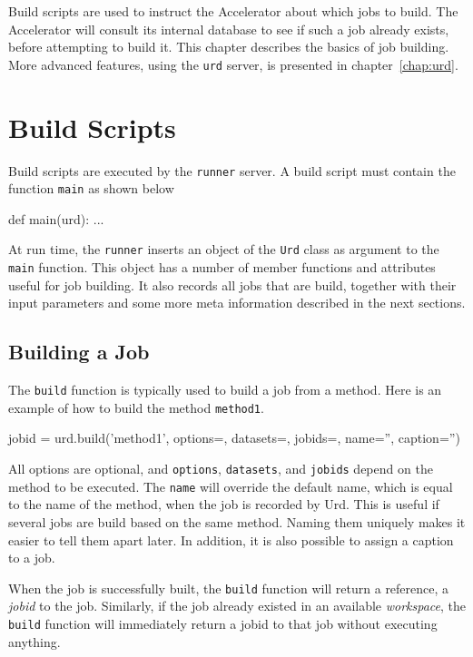 \label{chap:urd_basic}

Build scripts are used to instruct the Accelerator about which jobs to
build.  The Accelerator will consult its internal database to see if
such a job already exists, before attempting to build it.  This
chapter describes the basics of job building.  More advanced features,
using the \texttt{urd} server, is presented in chapter~\ref{chap:urd}.


\section{Build Scripts}
Build scripts are executed by the \texttt{runner} server.  A build
script must contain the function \texttt{main} as shown below
\begin{python}
def main(urd):
    ...
\end{python}
At run time, the \texttt{runner} inserts an object of the \texttt{Urd}
class as argument to the \texttt{main} function.  This object has a
number of member functions and attributes useful for job building.  It
also records all jobs that are build, together with their input
parameters and some more meta information described in the next
sections.

\subsection{Building a Job}
The \texttt{build} function is typically used to build a job from a
method.  Here is an example of how to build the method
\texttt{method1}.
\begin{python}
jobid = urd.build('method1', options={}, datasets={}, jobids={}, name='', caption='')
\end{python}
All options are optional, and \texttt{options}, \texttt{datasets}, and
\texttt{jobids} depend on the method to be executed.  The
\texttt{name} will override the default name, which is equal to the
name of the method, when the job is recorded by Urd.  This is useful
if several jobs are build based on the same method.  Naming them
uniquely makes it easier to tell them apart later.  In addition, it is
also possible to assign a caption to a job.

When the job is successfully built, the \texttt{build} function will
return a reference, a \textsl{jobid} to the job.  Similarly, if the
job already existed in an available \textsl{workspace}, the
\texttt{build} function will immediately return a jobid to that job
without executing anything.


